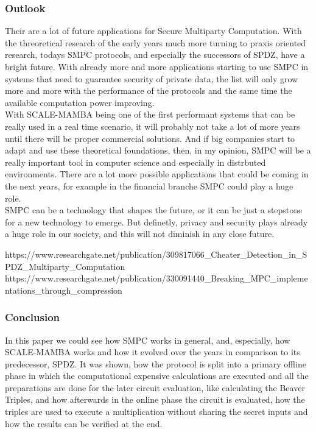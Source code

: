 \documentclass[english,runningheads,a4paper]{llncs}[2018/03/10]
\begin{document}
\subsubsection{Outlook}
Their are a lot of future applications for Secure Multiparty Computation. With the threoretical research of the early years much more turning to praxis oriented research, todays SMPC protocols, and especially the successors of SPDZ, have a bright future. With already more and more applications starting to use SMPC in systems that need to guarantee security of private data, the list will only grow more and more with the performance of the protocols and the same time the available computation power improving. \\
With SCALE-MAMBA being one of the first performant systems that can be really used in a real time scenario, it will probably not take a lot of more years until there will be proper commercial solutions. And if big companies start to adapt and use these theoretical foundations, then, in my opinion, SMPC will be a really important tool in computer science and especially in distrbuted environments. There are a lot more possible applications that could be coming in the next years, for example in the financial branche SMPC could play a huge role.\\
SMPC can be a technology that shapes the future, or it can be just a stepstone for a new technology to emerge. But definetly, privacy and security plays already a huge role in our society, and this will not diminish in any close future.


https://www.researchgate.net/publication/309817066\_Cheater\_Detection\_in\_SPDZ\_Multiparty\_Computation
https://www.researchgate.net/publication/330091440\_Breaking\_MPC\_implementations\_through\_compression


\subsubsection{Conclusion}

In this paper we could see how SMPC works in general, and, especially, how SCALE-MAMBA works and how it evolved over the years in comparison to its predecessor, SPDZ. It was shown, how the protocol is split into a primary offline phase in which the computational expensive calculations are executed and all the preparations are done for the later circuit evaluation, like calculating the Beaver Triples, and how afterwards in the online phase the circuit is evaluated, how the triples are used to execute a multiplication without sharing the secret inputs and how the results can be verified at the end. 
\end{document}
